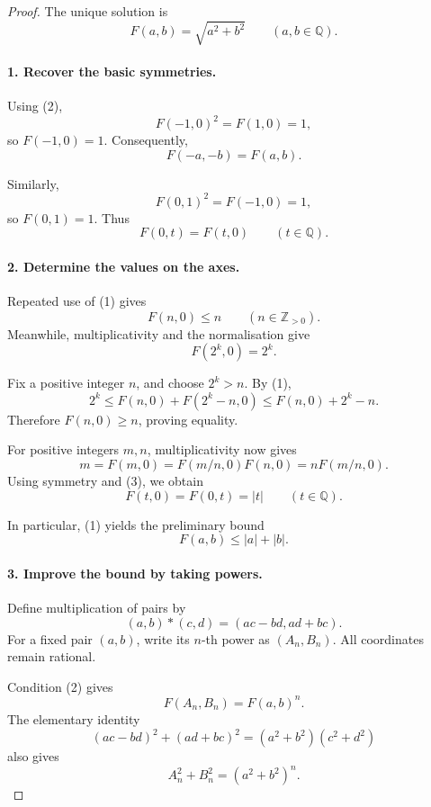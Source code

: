 
\begin{dlsummary}[title={\bfseries Solution 63. The Hidden Euclidean Length},breakable]

\begin{proof}
The unique solution is
\[
\boxed{F(a,b)=\sqrt{a^2+b^2}\qquad(a,b\in\mathbb Q).}
\]

\paragraph{1. Recover the basic symmetries.}

Using (2),
\[
F(-1,0)^2=F(1,0)=1,
\]
so \(F(-1,0)=1\). Consequently,
\[
F(-a,-b)=F(a,b).
\]

Similarly,
\[
F(0,1)^2=F(-1,0)=1,
\]
so \(F(0,1)=1\). Thus
\[
F(0,t)=F(t,0)\qquad(t\in\mathbb Q). \tag{3}
\]

\paragraph{2. Determine the values on the axes.}

Repeated use of (1) gives
\[
F(n,0)\le n\qquad(n\in\mathbb Z_{>0}).
\]
Meanwhile, multiplicativity and the normalisation give
\[
F(2^k,0)=2^k.
\]

Fix a positive integer \(n\), and choose \(2^k>n\). By (1),
\[
2^k
\le F(n,0)+F(2^k-n,0)
\le F(n,0)+2^k-n.
\]
Therefore \(F(n,0)\ge n\), proving equality.

For positive integers \(m,n\), multiplicativity now gives
\[
m=F(m,0)=F(m/n,0)F(n,0)=nF(m/n,0).
\]
Using symmetry and (3), we obtain
\[
\boxed{F(t,0)=F(0,t)=|t|\qquad(t\in\mathbb Q).} \tag{4}
\]

In particular, (1) yields the preliminary bound
\[
\boxed{F(a,b)\le |a|+|b|.} \tag{5}
\]

\paragraph{3. Improve the bound by taking powers.}

Define multiplication of pairs by
\[
(a,b)\ast(c,d)=(ac-bd,ad+bc).
\]
For a fixed pair \((a,b)\), write its \(n\)-th power as \((A_n,B_n)\). All coordinates remain rational.

Condition (2) gives
\[
F(A_n,B_n)=F(a,b)^n.
\]
The elementary identity
\[
(ac-bd)^2+(ad+bc)^2=(a^2+b^2)(c^2+d^2)
\]
also gives
\[
A_n^2+B_n^2=(a^2+b^2)^n.
\]


\end{proof}
\end{dlsummary}
